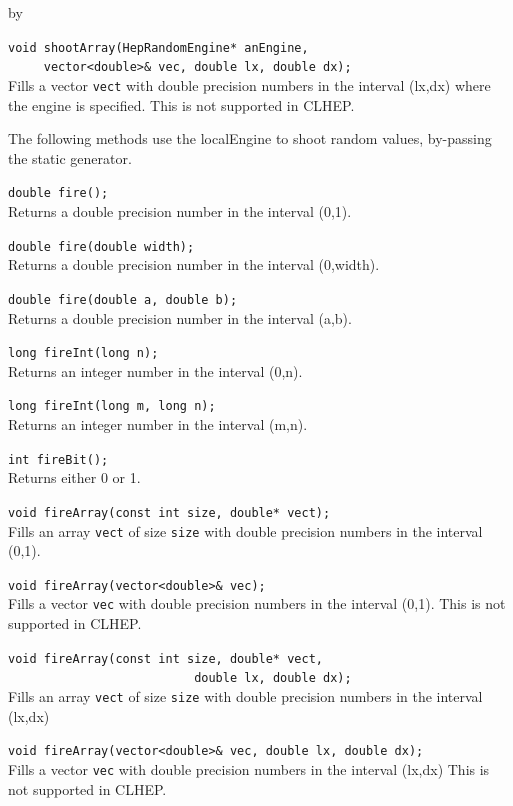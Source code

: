\documentclass[twoside]{article}
\newcommand{\comp}[1]{\texttt{#1}}%
\newcommand{\entrylabel}[1]{\mbox{\textbf{{#1}}}\hfil}%
\newenvironment{entry}
{\begin{list}{}%
    {\renewcommand{\makelabel}{\entrylabel}%
     \setlength{\labelwidth}{90pt}%
     \setlength{\leftmargin}{\labelwidth}
     \advance\leftmargin by \labelsep%
      }%
    }%
  {\end{list}}
\newcommand{\Entrylabel}[1]%
{\raisebox{0pt}[1ex][0pt]{\makebox[\labelwidth][l]%
    {\parbox[t]{\labelwidth}{\hspace{0pt}\textbf{{#1}}}}}}
\newenvironment{Entry}%
{\renewcommand{\entrylabel}{\Entrylabel}\begin{entry}}%
  {\end{entry}}
\begin{document}
\begin{description}
\begin{Entry}
   \verb+void shootArray(HepRandomEngine* anEngine,+\\ 
   \verb+     vector<double>& vec, double lx, double dx);+\\
   Fills a vector \comp{vect} with double
   precision numbers in the interval (lx,dx) where the engine is
   specified.  This is not supported in CLHEP.
   
  The following methods use the localEngine to shoot random values,
  by-passing the static generator.

   \verb+double fire();+\\
   Returns a double precision number in the interval (0,1).
  
   \verb+double fire(double width);+\\
   Returns a double precision number in the interval (0,width).
   
   \verb+double fire(double a, double b);+\\
   Returns a double precision number in the interval (a,b).

   \verb+long fireInt(long n);+\\
   Returns an integer number in the interval (0,n).
  
   \verb+long fireInt(long m, long n);+\\
   Returns an integer number in the interval (m,n).

   \verb+int fireBit();+\\
   Returns either 0 or 1.
  
   \verb+void fireArray(const int size, double* vect);+\\
   Fills an array \comp{vect} of size \comp{size} with double
   precision numbers in the interval (0,1).

   \verb+void fireArray(vector<double>& vec);+\\
   Fills a vector \comp{vec} with double
   precision numbers in the interval (0,1).
   This is not supported in CLHEP.
   
   \verb+void fireArray(const int size, double* vect,+\\
   \verb+                          double lx, double dx);+\\
   Fills an array \comp{vect} of size \comp{size} with double
   precision numbers in the interval (lx,dx)

   \verb+void fireArray(vector<double>& vec, double lx, double dx);+\\
   Fills a vector \comp{vec} with double
   precision numbers in the interval (lx,dx)
   This is not supported in CLHEP.
   

\end{Entry}
\end{description}
\end{document}
